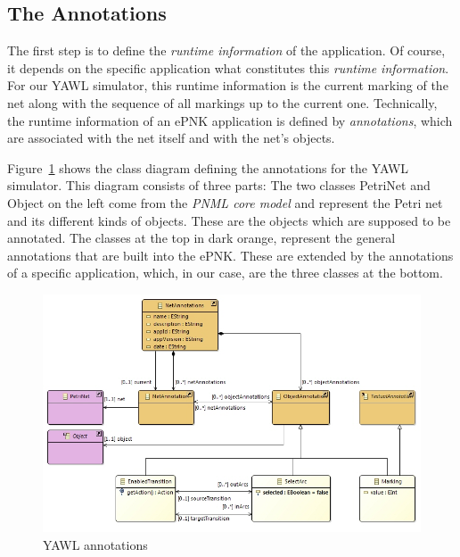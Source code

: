 \documentclass[a4paper]{llncs}
\begin{document}
\subsection{The Annotations}
\label{subsec:yawl-annot}

The first step is to define the \emph{runtime information} of the application.
Of course, it depends on the specific application what constitutes this
\emph{runtime information}. For our YAWL simulator, this runtime
information is the current marking of the net along with the
sequence of all markings up to the current one. Technically, the runtime
information of an ePNK application is defined by \emph{annotations},
which are associated with the net itself and with the net's objects.

Figure~\ref{fig:YAWLAnnotations} shows the class diagram defining the annotations
for the YAWL simulator. This diagram consists of three parts: The two classes
{\sf PetriNet} and {\sf Object} on the left come from the \emph{PNML core model} \cite{HKea09}
and represent the Petri net and its different kinds of objects. These are
the objects which are supposed to be annotated. The classes at the top
in dark orange, represent the general annotations that are built into
the ePNK. These are extended by the annotations of a specific application,
which, in our case, are the three classes at the bottom.
%
\begin{figure}[tb!!]
  \centerline{\includegraphics[scale=.35]{yawl-annotations}}
  \caption{YAWL annotations}
  \label{fig:YAWLAnnotations}
\end{figure}
\end{document}
